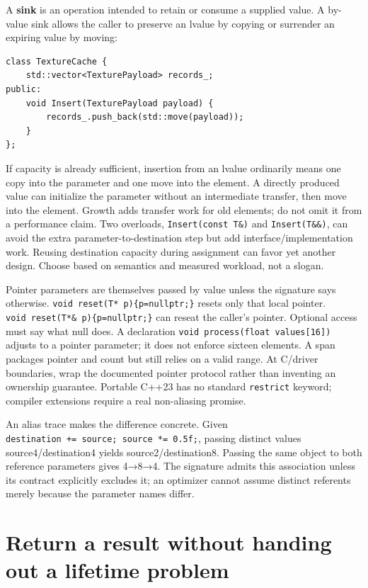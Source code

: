 A \textbf{sink} is an operation intended to retain or consume a supplied value. A by-value sink allows the caller to preserve an lvalue by copying or surrender an expiring value by moving:

\begin{verbatim}
class TextureCache {
    std::vector<TexturePayload> records_;
public:
    void Insert(TexturePayload payload) {
        records_.push_back(std::move(payload));
    }
};
\end{verbatim}

If capacity is already sufficient, insertion from an lvalue ordinarily means one copy into the parameter and one move into the element. A directly produced value can initialize the parameter without an intermediate transfer, then move into the element. Growth adds transfer work for old elements; do not omit it from a performance claim. Two overloads, \texttt{Insert(const\ T\&)} and \texttt{Insert(T\&\&)}, can avoid the extra parameter-to-destination step but add interface/implementation work. Reusing destination capacity during assignment can favor yet another design. Choose based on semantics and measured workload, not a slogan.

Pointer parameters are themselves passed by value unless the signature says otherwise. \texttt{void\ reset(T*\ p)\{p=nullptr;\}} resets only that local pointer. \texttt{void\ reset(T*\&\ p)\{p=nullptr;\}} can reseat the caller's pointer. Optional access must say what null does. A declaration \texttt{void\ process(float\ values{[}16{]})} adjusts to a pointer parameter; it does not enforce sixteen elements. A span packages pointer and count but still relies on a valid range. At C/driver boundaries, wrap the documented pointer protocol rather than inventing an ownership guarantee. Portable C++23 has no standard \texttt{restrict} keyword; compiler extensions require a real non-aliasing promise.

An alias trace makes the difference concrete. Given \texttt{destination\ +=\ source;\ source\ *=\ 0.5f;}, passing distinct values source4/destination4 yields source2/destination8. Passing the same object to both reference parameters gives 4→8→4. The signature admits this association unless its contract explicitly excludes it; an optimizer cannot assume distinct referents merely because the parameter names differ.

\section{Return a result without handing out a lifetime problem}\label{01-foundations-i-ch003-return-a-result-without-handing-out-a-lifetime-problem}

